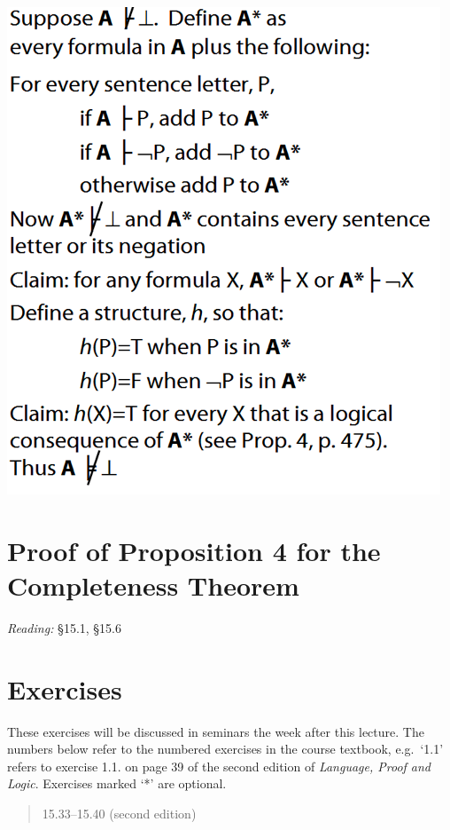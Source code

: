 \documentclass[12pt]{extarticle}
\begin{document}
\begin{multicols*}{3}
\begin{center}
\includegraphics[scale=0.3]{img/unit_455_completeness.png}
\end{center}
 
 
\section{Proof of Proposition 4 for the Completeness Theorem}
 
\emph{Reading:} §15.1, §15.6
 
\vfill
\begin{minipage}{\columnwidth}
\section{Exercises}
These exercises will be discussed in seminars the week after this lecture.
The numbers below refer to the numbered exercises in the course textbook, e.g.\ `1.1' refers to exercise 1.1. on page 39 of the second edition of \emph{Language, Proof and Logic}. Exercises marked `*' are optional.
 
\begin{quote}
15.33--15.40 (second edition)
 
\end{quote}
\end{minipage}
 


\end{multicols*}
\end{document}
